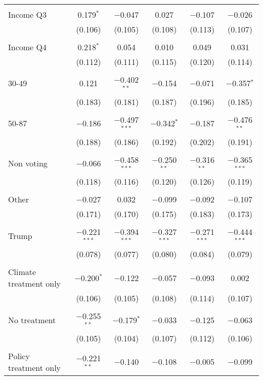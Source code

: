 \begin{tabular}{@{\extracolsep{5pt}}lccccc}
  & & & & & \\ 
 Income Q3 & 0.179$^{*}$ & $-$0.047 & 0.027 & $-$0.107 & $-$0.026 \\ 
  & (0.106) & (0.105) & (0.108) & (0.113) & (0.107) \\ 
  & & & & & \\ 
 Income Q4 & 0.218$^{*}$ & 0.054 & 0.010 & 0.049 & 0.031 \\ 
  & (0.112) & (0.111) & (0.115) & (0.120) & (0.114) \\ 
  & & & & & \\ 
 30-49 & 0.121 & $-$0.402$^{**}$ & $-$0.154 & $-$0.071 & $-$0.357$^{*}$ \\ 
  & (0.183) & (0.181) & (0.187) & (0.196) & (0.185) \\ 
  & & & & & \\ 
 50-87 & $-$0.186 & $-$0.497$^{***}$ & $-$0.342$^{*}$ & $-$0.187 & $-$0.476$^{**}$ \\ 
  & (0.188) & (0.186) & (0.192) & (0.202) & (0.191) \\ 
  & & & & & \\ 
 Non voting & $-$0.066 & $-$0.458$^{***}$ & $-$0.250$^{**}$ & $-$0.316$^{**}$ & $-$0.365$^{***}$ \\ 
  & (0.118) & (0.116) & (0.120) & (0.126) & (0.119) \\ 
  & & & & & \\ 
 Other & $-$0.027 & 0.032 & $-$0.099 & $-$0.092 & $-$0.107 \\ 
  & (0.171) & (0.170) & (0.175) & (0.183) & (0.173) \\ 
  & & & & & \\ 
 Trump & $-$0.221$^{***}$ & $-$0.394$^{***}$ & $-$0.327$^{***}$ & $-$0.271$^{***}$ & $-$0.444$^{***}$ \\ 
  & (0.078) & (0.077) & (0.080) & (0.084) & (0.079) \\ 
  & & & & & \\ 
 Climate treatment only & $-$0.200$^{*}$ & $-$0.122 & $-$0.057 & $-$0.093 & 0.002 \\ 
  & (0.106) & (0.105) & (0.108) & (0.114) & (0.107) \\ 
  & & & & & \\ 
 No treatment & $-$0.255$^{**}$ & $-$0.179$^{*}$ & $-$0.033 & $-$0.125 & $-$0.063 \\ 
  & (0.105) & (0.104) & (0.107) & (0.112) & (0.106) \\ 
  & & & & & \\ 
 Policy treatment only & $-$0.221$^{**}$ & $-$0.140 & $-$0.108 & $-$0.005 & $-$0.099 \\ 

\end{tabular}
